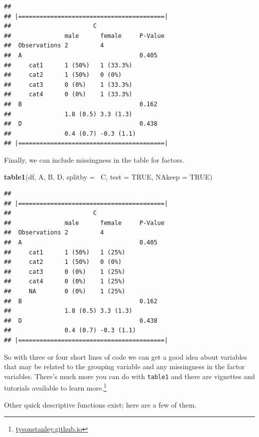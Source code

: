\documentclass[]{tufte-book}
\newenvironment{Shaded}{}{}
\newcommand{\KeywordTok}[1]{\textcolor[rgb]{0.00,0.44,0.13}{\textbf{#1}}}
\newcommand{\DataTypeTok}[1]{\textcolor[rgb]{0.56,0.13,0.00}{#1}}
\newcommand{\OtherTok}[1]{\textcolor[rgb]{0.00,0.44,0.13}{#1}}
\newcommand{\OperatorTok}[1]{\textcolor[rgb]{0.40,0.40,0.40}{#1}}
\newcommand{\NormalTok}[1]{#1}
\theoremstyle{definition}
\theoremstyle{definition}
\theoremstyle{remark}
\begin{document}
\begin{verbatim}
## 
## |=========================================|
##                       C 
##               male      female     P-Value
##  Observations 2         4                 
##  A                                 0.405  
##     cat1      1 (50%)   1 (33.3%)         
##     cat2      1 (50%)   0 (0%)            
##     cat3      0 (0%)    1 (33.3%)         
##     cat4      0 (0%)    1 (33.3%)         
##  B                                 0.162  
##               1.8 (0.5) 3.3 (1.3)         
##  D                                 0.438  
##               0.4 (0.7) -0.3 (1.1)        
## |=========================================|
\end{verbatim}

Finally, we can include missingness in the table for factors.

\begin{Shaded}
\begin{Highlighting}[]
\KeywordTok{table1}\NormalTok{(df, A, B, D, }\DataTypeTok{splitby =} \OperatorTok{~}\NormalTok{C, }\DataTypeTok{test =} \OtherTok{TRUE}\NormalTok{, }
    \DataTypeTok{NAkeep =} \OtherTok{TRUE}\NormalTok{)}
\end{Highlighting}
\end{Shaded}

\begin{verbatim}
## 
## |=========================================|
##                       C 
##               male      female     P-Value
##  Observations 2         4                 
##  A                                 0.405  
##     cat1      1 (50%)   1 (25%)           
##     cat2      1 (50%)   0 (0%)            
##     cat3      0 (0%)    1 (25%)           
##     cat4      0 (0%)    1 (25%)           
##     NA        0 (0%)    1 (25%)           
##  B                                 0.162  
##               1.8 (0.5) 3.3 (1.3)         
##  D                                 0.438  
##               0.4 (0.7) -0.3 (1.1)        
## |=========================================|
\end{verbatim}

So with three or four short lines of code we can get a good idea about
variables that may be related to the grouping variable and any
missingness in the factor variables. There's much more you can do with
\texttt{table1} and there are vignettes and tutorials available to learn
more.\footnote{\url{tysonstanley.github.io}}

Other quick descriptive functions exist; here are a few of them.
\end{document}

